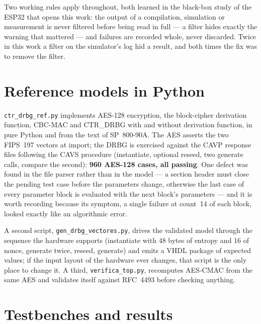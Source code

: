 Two working rules apply throughout, both learned in the black-box study
of the ESP32 that opens this work: the output of a compilation, simulation or
measurement is never filtered before being read in full --- a filter
hides exactly the warning that mattered --- and failures are recorded
whole, never discarded. Twice in this work a filter on the simulator's
log hid a result, and both times the fix was to remove the filter.

\section{Reference models in Python}
\label{sec:refmodels}

\texttt{ctr\_drbg\_ref.py} implements AES-128 encryption, the block-cipher
derivation function, CBC-MAC and CTR\_DRBG with and without derivation
function, in pure Python and from the text of SP~800-90A. The AES asserts
the two FIPS~197 vectors at import; the DRBG is exercised against the CAVP
response files following the CAVS procedure (instantiate, optional reseed,
two generate calls, compare the second): \textbf{960 AES-128 cases, all
passing}. One defect was found in the file parser rather than in the
model --- a section header must close the pending test case before the
parameters change, otherwise the last case of every parameter block is
evaluated with the next block's parameters --- and it is worth recording
because its symptom, a single failure at count~14 of each block, looked
exactly like an algorithmic error.

A second script, \texttt{gen\_drbg\_vectores.py}, drives the validated
model through the sequence the hardware supports (instantiate with 48
bytes of entropy and 16 of nonce, generate twice, reseed, generate) and
emits a VHDL package of expected values; if the input layout of the
hardware ever changes, that script is the only place to change it. A
third, \texttt{verifica\_top.py}, recomputes AES-CMAC from the same AES and
validates itself against RFC~4493 before checking anything.

\section{Testbenches and results}
\label{sec:testbenches}

